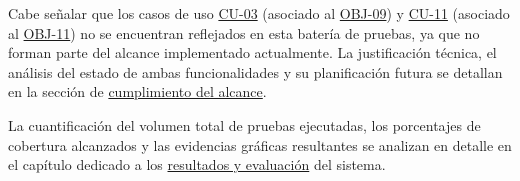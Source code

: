 \begin{table}[H]
  \centering
  \small
  \renewcommand{\arraystretch}{1.3}
  \setlength{\tabcolsep}{2.5pt}
  \caption{Matriz de trazabilidad pruebas \textit{E2E} con CU.}
  \label{tab:matriz_trazabilidad_pe_cu}
\end{table}

Cabe señalar que los casos de uso \hyperref[cu:03]{CU-03} (asociado al \hyperref[obj:09]{OBJ-09}) y \hyperref[cu:11]{CU-11} (asociado al \hyperref[obj:11]{OBJ-11}) no se encuentran reflejados en esta batería de pruebas, ya que no forman parte del alcance implementado actualmente. La justificación técnica, el análisis del estado de ambas funcionalidades y su planificación futura se detallan en la sección de \hyperref[sec:cumplimiento_alcance]{cumplimiento del alcance}.

La cuantificación del volumen total de pruebas ejecutadas, los porcentajes de cobertura alcanzados y las evidencias gráficas resultantes se analizan en detalle en el capítulo dedicado a los \hyperref[cap:resultados_y_evaluacion]{resultados y evaluación} del sistema.

